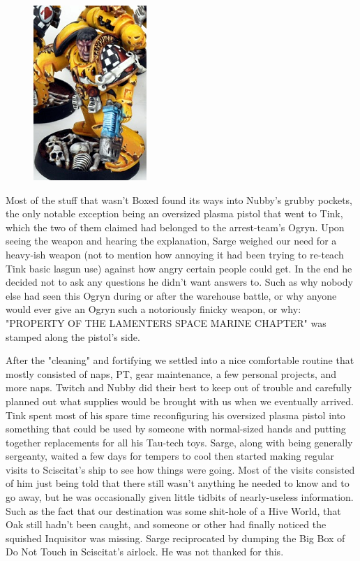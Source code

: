 \begin{figure}
	\begin{center}
		\includegraphics[width=\figwidth]{pics/17/26.png}
	\end{center}
\end{figure}
Most of the stuff that wasn't Boxed found its ways into Nubby's grubby pockets, the only notable exception being an oversized plasma pistol that went to Tink, which the two of them claimed had belonged to the arrest-team's Ogryn. 
Upon seeing the weapon and hearing the explanation, Sarge weighed our need for a heavy-ish weapon (not to mention how annoying it had been trying to re-teach Tink basic lasgun use) against how angry certain people could get. 
In the end he decided not to ask any questions he didn't want answers to. 
Such as why nobody else had seen this Ogryn during or after the warehouse battle, or why anyone would ever give an Ogryn such a notoriously finicky weapon, or why: 
"PROPERTY OF THE LAMENTERS SPACE MARINE CHAPTER" was stamped along the pistol's side.

After the "cleaning" and fortifying we settled into a nice comfortable routine that mostly consisted of naps, PT, gear maintenance, a few personal projects, and more naps. 
Twitch and Nubby did their best to keep out of trouble and carefully planned out what supplies would be brought with us when we eventually arrived. 
Tink spent most of his spare time reconfiguring his oversized plasma pistol into something that could be used by someone with normal-sized hands and putting together replacements for all his Tau-tech toys. 
Sarge, along with being generally sergeanty, waited a few days for tempers to cool then started making regular visits to Sciscitat's ship to see how things were going. 
Most of the visits consisted of him just being told that there still wasn't anything he needed to know and to go away, but he was occasionally given little tidbits of nearly-useless information. 
Such as the fact that our destination was some shit-hole of a Hive World, that Oak still hadn't been caught, and someone or other had finally noticed the squished Inquisitor was missing. 
Sarge reciprocated by dumping the Big Box of Do Not Touch in Sciscitat's airlock. 
He was not thanked for this.

